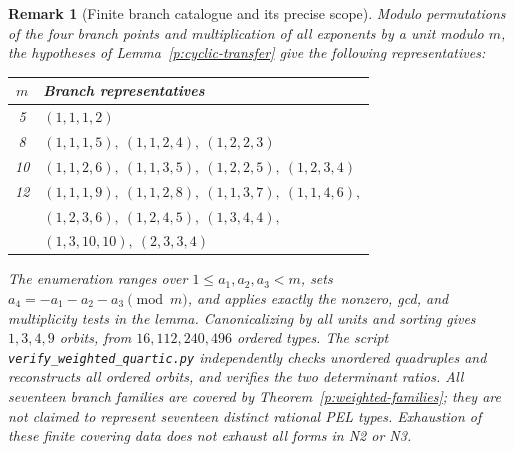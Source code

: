 \documentclass[11pt,reqno]{article}
\theoremstyle{emphasizedplain}
\theoremstyle{emphasizeddefinition}
\theoremstyle{emphasizeddefinition}
\newtheorem{remark}[theorem]{Remark}
\begin{document}
\begin{remark}[Finite branch catalogue and its precise scope]
Modulo permutations of the four branch points and multiplication of
all exponents by a unit modulo $m$, the hypotheses of
Lemma~\ref{p:cyclic-transfer} give the following representatives:
\begin{center}\small
\begin{tabular}{cl}
\toprule
$m$ & Branch representatives\\\midrule
5 & $(1,1,1,2)$\\
8 & $(1,1,1,5),\ (1,1,2,4),\ (1,2,2,3)$\\
10 & $(1,1,2,6),\ (1,1,3,5),\ (1,2,2,5),\ (1,2,3,4)$\\
12 & $(1,1,1,9),\ (1,1,2,8),\ (1,1,3,7),\ (1,1,4,6),$\\
 & $(1,2,3,6),\ (1,2,4,5),\ (1,3,4,4),$\\
 & $(1,3,10,10),\ (2,3,3,4)$\\\bottomrule
\end{tabular}
\end{center}
The enumeration ranges over $1\le a_1,a_2,a_3<m$, sets
$a_4=-a_1-a_2-a_3\pmod m$, and applies exactly the nonzero, gcd,
and multiplicity tests in the lemma. Canonicalizing by all units and
sorting gives $1,3,4,9$ orbits, from $16,112,240,496$ ordered types.
The script \texttt{verify\_weighted\_quartic.py} independently checks
unordered quadruples and reconstructs all ordered orbits, and verifies
the two determinant ratios. All seventeen branch families are covered
by Theorem~\ref{p:weighted-families}; they are not claimed to represent
seventeen distinct rational PEL types. Exhaustion of these finite
covering data does not exhaust all forms in N2 or N3.
\end{remark}
\end{document}
